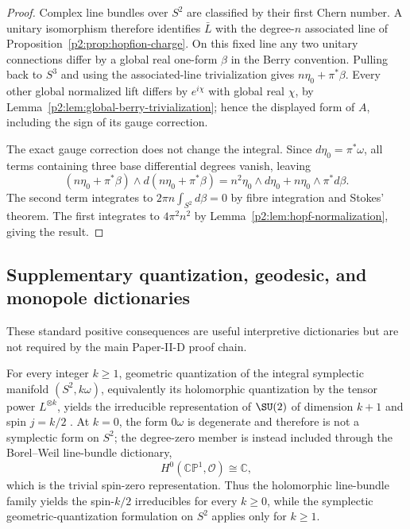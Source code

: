 \documentclass[11pt,a4paper]{article}
\begin{document}
\begin{proof}
Complex line bundles over \(S^2\) are classified by their first Chern
number.  A unitary isomorphism therefore identifies \(\bar L\) with the
degree-\(n\) associated line of
Proposition~\ref{p2:prop:hopfion-charge}.  On this fixed line any two
unitary connections differ by a global real one-form \(\beta\) in the
Berry convention.  Pulling back to \(S^3\) and using the associated-line
trivialization gives \(n\eta_0+\pi^*\beta\).  Every other global
normalized lift differs by \(e^{i\chi}\) with global real \(\chi\), by
Lemma~\ref{p2:lem:global-berry-trivialization}; hence the displayed form of
\(A\), including the sign of its gauge correction.

The exact gauge correction does not change the integral.  Since
\(d\eta_0=\pi^*\omega\), all terms containing three base differential
degrees vanish, leaving
\[
 (n\eta_0+\pi^*\beta)\wedge
 d(n\eta_0+\pi^*\beta)
 =n^2\eta_0\wedge d\eta_0+n\eta_0\wedge\pi^*d\beta.
\]
The second term integrates to
\(2\pi n\int_{S^2}d\beta=0\) by fibre integration and Stokes' theorem.
The first integrates to \(4\pi^2n^2\) by
Lemma~\ref{p2:lem:hopf-normalization}, giving the result.
\end{proof}

\subsection{Supplementary quantization, geodesic, and monopole dictionaries}
\label{p2d:app:supplementary-geometry}
These standard positive consequences are useful interpretive dictionaries but
are not required by the main Paper-II-D proof chain.

\begin{corollary}
\label{p2:cor:cp1-geometric-quantization}
For every integer \(k\ge1\), geometric quantization of the integral
symplectic manifold \((S^2,k\omega)\), equivalently its holomorphic
quantization by the tensor power \(L^{\otimes k}\), yields the irreducible
representation of \(\SU(2)\) of dimension \(k+1\) and spin \(j=k/2\)
\cite{Kirillov2004lectures}.  At \(k=0\), the form \(0\omega\) is
degenerate and therefore is not a symplectic form on \(S^2\); the
degree-zero member is instead included through the Borel--Weil line-bundle
dictionary,
\[
H^0(\mathbb{CP}^1,\mathcal O)\cong\mathbb C,
\]
which is the trivial spin-zero representation.  Thus the holomorphic
line-bundle family yields the spin-\(k/2\) irreducibles for every
\(k\ge0\), while the symplectic geometric-quantization formulation on
\(S^2\) applies only for \(k\ge1\).
\end{corollary}
\end{document}
